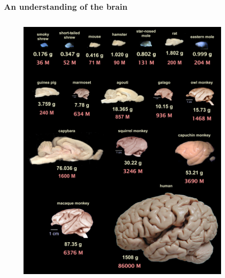 \begin{frame}[c]
  \frametitle{An understanding of the brain}
  \begin{columns}
    \begin{column}{0.5\textwidth}
      \begin{figure}[h]
        \centering
        \includegraphics[width=\textwidth]{99_images/brain-sizes.jpg}
      \end{figure}
    \end{column}
    \begin{column}{0.5\textwidth}
      \begin{itemize}
\end{itemize}
\end{column}
\end{columns}
\end{frame}
